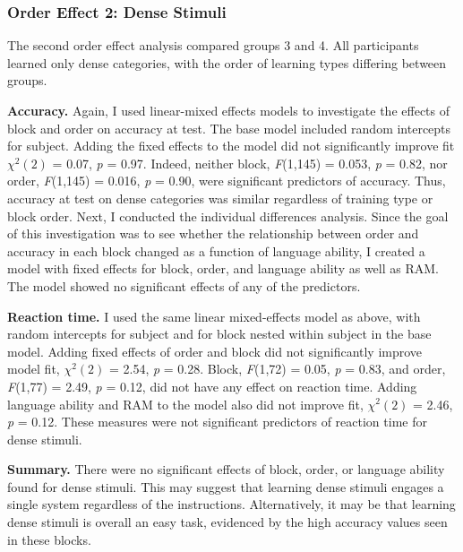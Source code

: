 \documentclass[../dissertation.tex]{subfiles}
\begin{document}
\subsubsection{Order Effect 2: Dense Stimuli}
	The second order effect analysis compared groups 3 and 4. All participants learned only dense categories, with the order of learning types differing between groups. \par
	\textbf{Accuracy.} Again, I used linear-mixed effects models to investigate the effects of block and order on accuracy at test. The base model included random intercepts for subject. Adding the fixed effects to the model did not significantly improve fit $\chi^{2}(2)$ = 0.07,  \textit{p} = 0.97. Indeed, neither block, \textit{F}(1,145) = 0.053, \textit{p} = 0.82, nor order, \textit{F}(1,145) = 0.016, \textit{p} = 0.90, were significant predictors of accuracy. Thus, accuracy at test on dense categories was similar regardless of training type or block order.
	Next, I conducted the individual differences analysis. Since the goal of this investigation was to see whether the relationship between order and accuracy in each block changed as a function of language ability, I created a model with fixed effects for block, order, and language ability as well as RAM. The model showed no significant effects of any of the predictors. \par 
	\textbf{Reaction time.} I used the same linear mixed-effects model as above, with random intercepts for subject and for block nested within subject in the base model. Adding fixed effects of order and block did not significantly improve model fit, $\chi^{2}(2)$ = 2.54, \textit{p} = 0.28. Block, \textit{F}(1,72) = 0.05, \textit{p} = 0.83, and order, \textit{F}(1,77) = 2.49, \textit{p} = 0.12, did not have any effect on reaction time. Adding language ability and RAM to the model also did not improve fit, $\chi^{2}(2)$ = 2.46, \textit{p} = 0.12. These measures were not significant predictors of reaction time for dense stimuli.\par
	\textbf{Summary.} There were no significant effects of block, order, or language ability found for dense stimuli. This may suggest that learning dense stimuli engages a single system regardless of the instructions. Alternatively, it may be that learning dense stimuli is overall an easy task, evidenced by the high accuracy values seen in these blocks.
	
\end{document}
